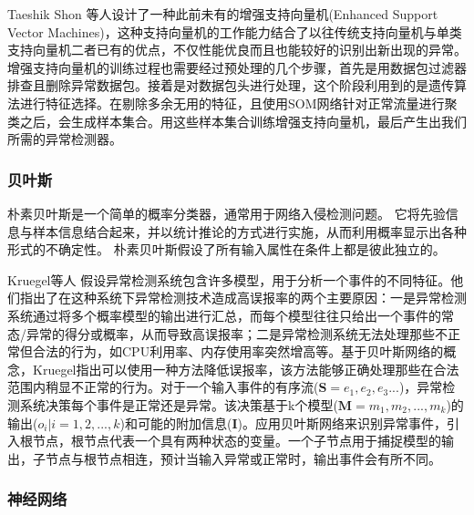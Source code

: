 
Taeshik Shon 等人\cite{shon2005machine}设计了一种此前未有的增强支持向量机(Enhanced Support Vector Machines)，这种支持向量机的工作能力结合了以往传统支持向量机与单类支持向量机二者已有的优点，不仅性能优良而且也能较好的识别出新出现的异常。增强支持向量机的训练过程也需要经过预处理的几个步骤，首先是用数据包过滤器排查且删除异常数据包。接着是对数据包头进行处理，这个阶段利用到的是遗传算法进行特征选择。在剔除多余无用的特征，且使用SOM网络针对正常流量进行聚类之后，会生成样本集合。用这些样本集合训练增强支持向量机，最后产生出我们所需的异常检测器。


\subsubsection{贝叶斯}

朴素贝叶斯是一个简单的概率分类器，通常用于网络入侵检测问题。 它将先验信息与样本信息结合起来，并以统计推论的方式进行实施，从而利用概率显示出各种形式的不确定性。 朴素贝叶斯假设了所有输入属性在条件上都是彼此独立的。

Kruegel等人\cite{kruegel2003bayesian} 假设异常检测系统包含许多模型，用于分析一个事件的不同特征。他们指出了在这种系统下异常检测技术造成高误报率的两个主要原因：一是异常检测系统通过将多个概率模型的输出进行汇总，而每个模型往往只给出一个事件的常态/异常的得分或概率，从而导致高误报率；二是异常检测系统无法处理那些不正常但合法的行为，如CPU利用率、内存使用率突然增高等。基于贝叶斯网络的概念，Kruegel\citep{kruegel2003bayesian}指出可以使用一种方法降低误报率，该方法能够正确处理那些在合法范围内稍显不正常的行为。对于一个输入事件的有序流($\symbf{S}=e_1,e_2,e_3...$)，异常检测系统决策每个事件是正常还是异常。该决策基于k个模型($\symbf{M}=m_1,m_2,...,m_k$)的输出($o_i|i=1,2,...,k$)和可能的附加信息($\symbf{I}$)。应用贝叶斯网络来识别异常事件，引入根节点，根节点代表一个具有两种状态的变量。一个子节点用于捕捉模型的输出，子节点与根节点相连，预计当输入异常或正常时，输出事件会有所不同。

\subsubsection{神经网络}

